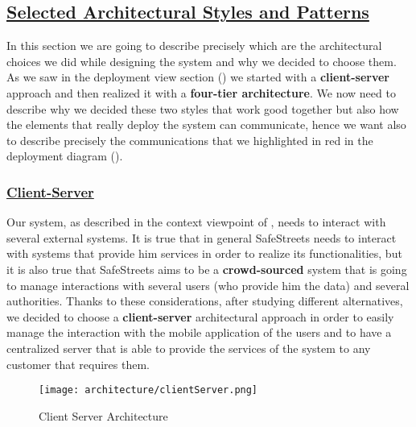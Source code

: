 	
		\FloatBarrier
		
	\subsection[Selected Architectural Styles and Patterns]{\hyperlink{toc}{Selected Architectural Styles and Patterns}}
		\label{sec:selectedArchitecturalStylesAndPatterns}
		
		In this section we are going to describe precisely which are the architectural choices we did while designing the system and why we decided to choose them. As we saw in the deployment view section () we started with a \textbf{client-server} approach and then realized it with a \textbf{four-tier architecture}. We now need to describe why we decided these two styles that work good together but also how the elements that really deploy the system can communicate, hence we want also to describe precisely the communications that we highlighted in red in the deployment diagram ().
		
		\subsubsection[Client-Server]{\hyperlink{toc}{Client-Server}}
			\label{sec:clientServerDecision}
			
			Our system, as described in the context viewpoint of , needs to interact with several external systems. It is true that in general SafeStreets needs to interact with systems that provide him services in order to realize its functionalities, but it is also true that SafeStreets aims to be a \textbf{crowd-sourced} system that is going to manage interactions with several users (who provide him the data) and several authorities. Thanks to these considerations, after studying different alternatives, we decided to choose a \textbf{client-server} architectural approach in order to easily manage the interaction with the mobile application of the users and to have a centralized server that is able to provide the services of the system to any customer that requires them.
			
			\vspace{0.3cm}
			
			\begin{figure}[h!]
				\centering
				\texttt{[image: architecture/clientServer.png]}
				\caption{\label{fig:clientServerArchitecture} Client Server Architecture}
			\end{figure}

